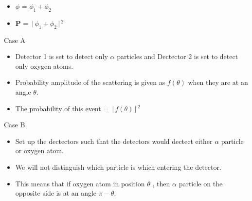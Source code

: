 \documentclass[aspectratio=169]{beamer}
\begin{document}
\begin{frame}{}

	\begin{itemize}

		\item $ \phi $ = $ \phi_{1} + \phi_{2} $ \newline
		\item \textbf{P} = $ \,\Bigr\rvert\,\phi_{1} + \phi_{2} \,\Bigr\rvert\,^{2} $ 
	
	\end{itemize}
	
\end{frame}

\begin{frame}{Case A}

	\begin{itemize}
		\item Detector 1 is set to detect only $ \alpha $ particles and Dectector 2 is set to detect only oxygen atoms.\newline
		\item Probability amplitude of the scattering is given as $ f(\theta)$ when they are at an angle $\theta$.\newline
		\item The probability of this event = $ \,\Bigr\rvert\,f(\theta) \,\Bigr\rvert\,^{2} $
	\end{itemize}
		
\end{frame}


\begin{frame}{Case B}

	\begin{itemize}
	
		\item Set up the dectectors such that the detectors would dectect either $\alpha$ particle or oxygen atom.\newline
		\item We will not distinguish which particle is which entering the detector.\newline
		\item This means that if oxygen atom in position $\theta$ , then
		$\alpha$ particle on the opposite side is at an angle $\pi-\theta$.
		
	\end{itemize}
	
\end{frame}
\end{document}
